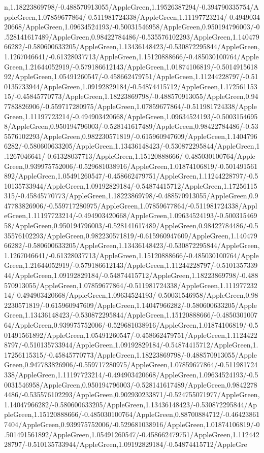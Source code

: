 {\begin{tikzternal}
{n,1.18223869798/-0.488570913055/AppleGreen,1.19526387294/-0.394790335754/AppleGreen,1.07859677864/-0.511981724338/AppleGreen,1.11197723214/-0.494903420668/AppleGreen,1.09634524193/-0.50031546958/AppleGreen,0.950194796003/-0.528141617489/AppleGreen,0.98422784486/-0.535576102293/AppleGreen,1.14047966282/-0.580600633205/AppleGreen,1.13436148423/-0.530872295844/AppleGreen,1.1267046641/-0.61328037713/AppleGreen,1.15120888666/-0.485030100764/AppleGreen,1.21644052919/-0.579186612143/AppleGreen,1.01874106819/-0.501491561892/AppleGreen,1.05491260547/-0.458662479751/AppleGreen,1.11244228797/-0.510135733944/AppleGreen,1.09192829184/-0.54874415712/AppleGreen,1.17256115315/-0.45845770773/AppleGreen,1.18223869798/-0.488570913055/AppleGreen,0.947783826906/-0.559717280975/AppleGreen,1.07859677864/-0.511981724338/AppleGreen,1.11197723214/-0.494903420668/AppleGreen,1.09634524193/-0.50031546958/AppleGreen,0.950194796003/-0.528141617489/AppleGreen,0.98422784486/-0.535576102293/AppleGreen,0.982230571819/-0.615960947609/AppleGreen,1.14047966282/-0.580600633205/AppleGreen,1.13436148423/-0.530872295844/AppleGreen,1.1267046641/-0.61328037713/AppleGreen,1.15120888666/-0.485030100764/AppleGreen,0.939975752006/-0.529681038916/AppleGreen,1.01874106819/-0.501491561892/AppleGreen,1.05491260547/-0.458662479751/AppleGreen,1.11244228797/-0.510135733944/AppleGreen,1.09192829184/-0.54874415712/AppleGreen,1.17256115315/-0.45845770773/AppleGreen,1.18223869798/-0.488570913055/AppleGreen,0.947783826906/-0.559717280975/AppleGreen,1.07859677864/-0.511981724338/AppleGreen,1.11197723214/-0.494903420668/AppleGreen,1.09634524193/-0.50031546958/AppleGreen,0.950194796003/-0.528141617489/AppleGreen,0.98422784486/-0.535576102293/AppleGreen,0.982230571819/-0.615960947609/AppleGreen,1.14047966282/-0.580600633205/AppleGreen,1.13436148423/-0.530872295844/AppleGreen,1.1267046641/-0.61328037713/AppleGreen,1.15120888666/-0.485030100764/AppleGreen,1.21644052919/-0.579186612143/AppleGreen,1.11244228797/-0.510135733944/AppleGreen,1.09192829184/-0.54874415712/AppleGreen,1.18223869798/-0.488570913055/AppleGreen,1.07859677864/-0.511981724338/AppleGreen,1.11197723214/-0.494903420668/AppleGreen,1.09634524193/-0.50031546958/AppleGreen,0.982230571819/-0.615960947609/AppleGreen,1.14047966282/-0.580600633205/AppleGreen,1.13436148423/-0.530872295844/AppleGreen,1.15120888666/-0.485030100764/AppleGreen,0.939975752006/-0.529681038916/AppleGreen,1.01874106819/-0.501491561892/AppleGreen,1.05491260547/-0.458662479751/AppleGreen,1.11244228797/-0.510135733944/AppleGreen,1.09192829184/-0.54874415712/AppleGreen,1.17256115315/-0.45845770773/AppleGreen,1.18223869798/-0.488570913055/AppleGreen,0.947783826906/-0.559717280975/AppleGreen,1.07859677864/-0.511981724338/AppleGreen,1.11197723214/-0.494903420668/AppleGreen,1.09634524193/-0.50031546958/AppleGreen,0.950194796003/-0.528141617489/AppleGreen,0.98422784486/-0.535576102293/AppleGreen,0.902930233871/-0.524755071977/AppleGreen,1.14047966282/-0.580600633205/AppleGreen,1.13436148423/-0.530872295844/AppleGreen,1.15120888666/-0.485030100764/AppleGreen,0.88700884712/-0.464238617404/AppleGreen,0.939975752006/-0.529681038916/AppleGreen,1.01874106819/-0.501491561892/AppleGreen,1.05491260547/-0.458662479751/AppleGreen,1.11244228797/-0.510135733944/AppleGreen,1.09192829184/-0.54874415712/AppleGre}
\end{tikzternal}}
